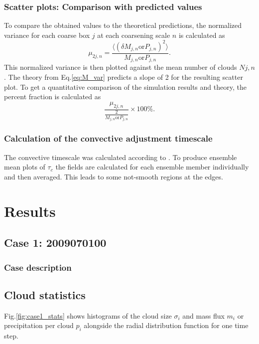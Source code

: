 \documentclass[a4paper, 12pt]{article}
\begin{document}
\subsubsection{Scatter plots: Comparison with predicted values}
To compare the obtained values to the theoretical predictions, the normalized variance for each coarse box $j$ at each coarsening scale $n$ is calculated as 
\begin{equation} \label{eq:normalized_variance}
 \mu_{2 j, n} = \frac{\langle (\delta M_{j,n} \mathrm{ or } P_{j,n})^2 \rangle}{M_{j,n} \mathrm{ or } P_{j,n}}.
\end{equation}
This normalized variance is then plotted against the mean number of clouds $N{j,n}$. The theory from Eq.\ref{eq:M_var} predicts a slope of 2 for the resulting scatter plot. To get a quantitative comparison of the simulation results and theory, the percent fraction is calculated as
\begin{equation} \label{eq:normalized_variance_percent}
 \frac{\mu_{2 j, n}}{\frac{2}{M_{j,n} \mathrm{ or } P_{j,n}}}\times 100\%.
\end{equation}

\subsubsection{Calculation of the convective adjustment timescale}
The convective timescale was calculated according to \cite{Flack2016}. To produce ensemble mean plots of $\tau_c$ the fields are calculated for each ensemble member individually and then averaged. This leads to some not-smooth regions at the edges. 

\section{Results}

\subsection{Case 1: 2009070100}
\subsubsection{Case description}

\subsection{Cloud statistics}
Fig.\ref{fig:case1_stats} shows histograms of the cloud size $\sigma_i$ and mass flux $m_i$ or precipitation per cloud $p_i$ alongside the radial distribution function for one time step. 
\end{document}
